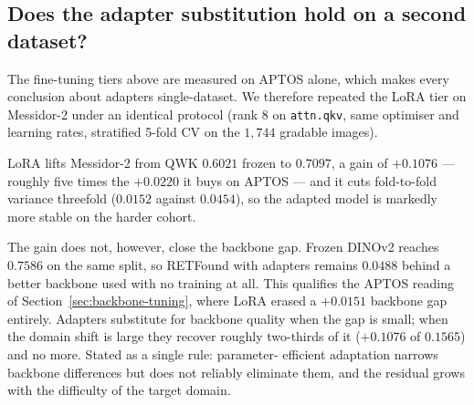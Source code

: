 \documentclass[journal]{IEEEtran}
\begin{document}
\subsection{Does the adapter substitution hold on a second dataset?}
\label{sec:messidor-lora}
The fine-tuning tiers above are measured on APTOS alone, which makes every
conclusion about adapters single-dataset. We therefore repeated the LoRA tier
on Messidor-2 under an identical protocol (rank 8 on \texttt{attn.qkv}, same
optimiser and learning rates, stratified 5-fold CV on the $1{,}744$ gradable
images).

LoRA lifts Messidor-2 from QWK $0.6021$ frozen to $0.7097$, a gain of $+0.1076$ --- roughly
five times the $+0.0220$ it buys on APTOS --- and it cuts fold-to-fold variance
threefold ($0.0152$ against $0.0454$), so the adapted model is markedly more
stable on the harder cohort.

The gain does not, however, close the backbone gap. Frozen DINOv2 reaches
$0.7586$ on the same split, so RETFound with adapters remains $0.0488$ behind a
better backbone used with no training at all. This qualifies the APTOS
reading of Section~\ref{sec:backbone-tuning}, where LoRA erased a $+0.0151$
backbone gap entirely. Adapters substitute for backbone quality when the gap
is small; when the domain shift is large they recover roughly two-thirds of
it ($+0.1076$ of $0.1565$) and no more. Stated as a single rule: parameter-
efficient adaptation narrows backbone differences but does not reliably
eliminate them, and the residual grows with the difficulty of the target
domain.
\end{document}
